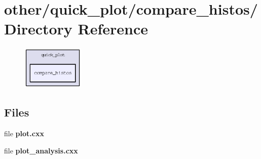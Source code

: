 \section{other/quick\_\-plot/compare\_\-histos/ Directory Reference}
\label{dir_2e517b2b1f1fc786fef6be876f1ff4f0}


\begin{figure}[H]
\begin{center}
\leavevmode
\includegraphics[width=84pt]{dir_2e517b2b1f1fc786fef6be876f1ff4f0_dep}
\end{center}
\end{figure}
\subsection*{Files}
\begin{CompactItemize}
\item 
file \textbf{plot.cxx}
\item 
file \textbf{plot\_\-analysis.cxx}
\end{CompactItemize}
